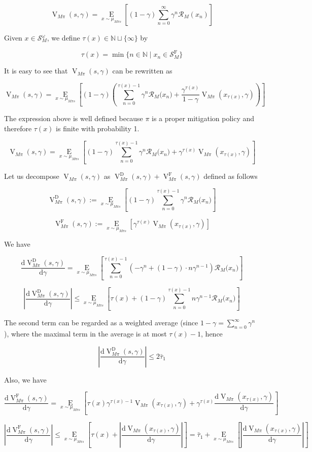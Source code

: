 \documentclass[a4paper]{article}
\newcommand{\AP}[1]{\left(#1\right)}
\newcommand{\AB}[1]{\left[#1\right]}
\newcommand{\Ea}[2]{\underset{#1}{\operatorname{E}}\AB{#2}}
\newcommand{\D}{\mathrm{d}}
\newcommand{\Nats}{\mathbb{N}}
\newcommand{\Abs}[1]{\left\vert #1 \right\vert}
\newcommand{\St}{\mathcal{S}}
\newcommand{\R}{\mathcal{R}}
\newcommand{\RMD}{\mathrm{D}}
\newcommand{\RMF}{\mathrm{F}}
\newcommand{\SF}{\St^{\RMF}}
\newcommand{\V}{\operatorname{V}}
\begin{document}
$$\V_{M\pi}(s,\gamma) = \Ea{x\sim\mu_{M\pi s}}{(1-\gamma)\sum_{n=0}^\infty \gamma^n \R_M\AP{x_n}}$$

Given $x\in\St_M^\omega$, we define $\tau(x) \in \Nats \sqcup \{\infty\}$ by 

$$\tau(x)=\min\{n \in \Nats \mid x_n \in \SF_M\}$$

It is easy to see that $\V_{M\pi}(s,\gamma)$ can be rewritten as

$$\V_{M\pi}(s,\gamma) = \Ea{x\sim\mu_{M\pi s}}{(1-\gamma)\AP{\sum_{n=0}^{\tau(x)-1} \gamma^n \R_M\Big(x_n\Big) + \frac{\gamma^{\tau(x)}}{1-\gamma}\V_{M\pi}\AP{x_{\tau(x)},\gamma}}}$$

The expression above is well defined because $\pi$ is a proper mitigation policy and therefore $\tau(x)$ is finite with probability 1.

$$\V_{M\pi}(s,\gamma) = \Ea{x\sim\mu_{M\pi s}}{(1-\gamma)\sum_{n=0}^{\tau(x)-1} \gamma^n \R_M\Big(x_n\Big) + \gamma^{\tau(x)}\V_{M\pi}\AP{x_{\tau(x)},\gamma}}$$

Let us decompose $\V_{M\pi}(s,\gamma)$ as $\V_{M\pi}^\RMD(s,\gamma)+\V_{M\pi}^\RMF(s,\gamma)$ defined as follows

$$\V_{M\pi}^\RMD(s,\gamma) := \Ea{x\sim\mu_{M\pi s}}{(1-\gamma)\sum_{n=0}^{\tau(x)-1} \gamma^n \R_M\Big(x_n\Big) }$$

$$\V_{M\pi}^\RMF(s,\gamma) := \Ea{x\sim\mu_{M\pi s}}{\gamma^{\tau(x)}\V_{M\pi}\AP{x_{\tau(x)},\gamma}}$$

We have

$$\frac{\D\V_{M\pi}^\RMD(s,\gamma)}{\D\gamma} = \Ea{x\sim\mu_{M\pi s}}{\sum_{n=0}^{\tau(x)-1} \AP{-\gamma^n+(1-\gamma)\cdot n\gamma^{n-1}} \R_M\Big(x_n\Big)}$$

$$\Abs{\frac{\D\V_{M\pi}^\RMD(s,\gamma)}{\D\gamma}} \leq \Ea{x\sim\mu_{M\pi s}}{\tau(x)+(1-\gamma)\sum_{n=0}^{\tau(x)-1} n\gamma^{n-1} \R_M\Big(x_n\Big) }$$

The second term can be regarded as a weighted average (since $1-\gamma=\sum_{n=0}^\infty \gamma^n$), where the maximal term in the average is at most $\tau(x)-1$, hence

$$\Abs{\frac{\D\V_{M\pi}^\RMD(s,\gamma)}{\D\gamma}} \leq 2 \bar{\tau}_1$$

Also, we have

$$\frac{\D\V_{M\pi}^\RMF(s,\gamma)}{\D\gamma} = \Ea{x\sim\mu_{M\pi s}}{\tau(x)\gamma^{\tau(x)-1}\V_{M\pi}\AP{x_{\tau(x)},\gamma}+\gamma^{\tau(x)}\frac{\D\V_{M\pi}\AP{x_{\tau(x)},\gamma}}{\D\gamma}}$$

$$\Abs{\frac{\D\V_{M\pi}^\RMF(s,\gamma)}{\D\gamma}} \leq \Ea{x\sim\mu_{M\pi s}}{ \tau(x)+\Abs{\frac{\D\V_{M\pi}\AP{x_{\tau(x)},\gamma}}{\D\gamma}}} = \bar{\tau}_1 + \Ea{x\sim\mu_{M\pi s}}{\Abs{\frac{\D\V_{M\pi}\AP{x_{\tau(x)},\gamma}}{\D\gamma}}}$$
\end{document}
